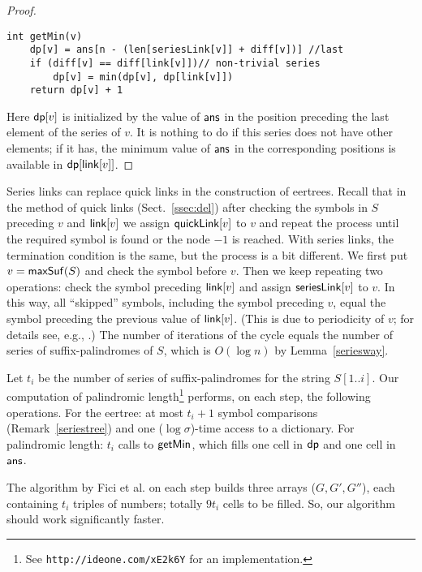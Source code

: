 \documentclass{llncs}
\def\maxsuf{{\sf maxSuf}}
\def\link{{\sf link}}
\def\quick{{\sf quickLink}}
\def\series{{\sf seriesLink}}
\def\ans{{\sf ans}}
\def\getmin{{\sf getMin}}
\def\ddp{{\sf dp}}
\begin{document}
\begin{proof}
\begin{lstlisting}
int getMin(v)
	dp[v] = ans[n - (len[seriesLink[v]] + diff[v])] //last 
	if (diff[v] == diff[link[v]])// non-trivial series
		dp[v] = min(dp[v], dp[link[v]])
	return dp[v] + 1
\end{lstlisting}

Here $\ddp[v]$ is initialized by the value of $\ans$ in the position preceding the last element of the series of $v$. It is nothing to do if this series does not have other elements; if it has, the minimum value of $\ans$ in the corresponding positions is available in $\ddp[\link[v]]$.
\end{proof}

\begin{remark} \label{seriestree}
Series links can replace quick links in the construction of eertrees. Recall that in the method of quick links (Sect.~\ref{ssec:del}) after checking the symbols in $S$ preceding $v$ and $\link[v]$ we assign $\quick[v]$ to $v$ and repeat the process until the required symbol is found or the node $-1$ is reached. With series links, the termination condition is the same, but the process is a bit different. We first put $v=\maxsuf(S)$ and check the symbol before $v$. Then we keep repeating two operations: check the symbol preceding $\link[v]$ and assign $\series[v]$ to $v$. In this way, all ``skipped'' symbols, including the symbol preceding $v$, equal the symbol preceding the previous value of $\link[v]$. (This is due to periodicity of $v$; for details see, e.g., \cite[Sect.\,2]{KRS15}.) The number of iterations of the cycle equals the number of series of suffix-palindromes of $S$, which is $O(\log n)$ by Lemma~\ref{seriesway}.
\end{remark}


\begin{remark}\label{ficiConst}
Let $t_i$ be the number of series of suffix-palindromes for the string $S[1..i]$. Our computation of palindromic length\footnote{See {\tt http://ideone.com/xE2k6Y} for an implementation.} performs, on each step, the following operations. For the eertree: at most $t_i{+}1$ symbol comparisons (Remark~\ref{seriestree}) and one ($\log\sigma$)-time access to a dictionary. For palindromic length: $t_i$ calls to $\getmin$, which fills one cell in $\ddp$ and one cell in $\ans$.

The algorithm by Fici et al. \cite[Figure 8]{FGKK14} on each step builds three arrays ($G, G', G''$), each containing $t_i$ triples of numbers; totally $9t_i$ cells to be filled. So, our algorithm should work significantly faster. 
\end{remark}
\end{document}

